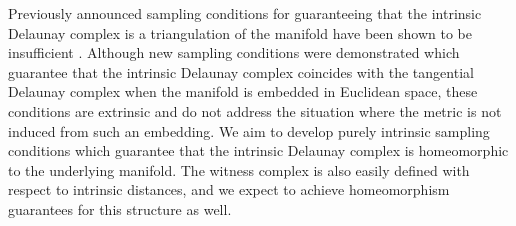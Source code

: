 Previously announced sampling conditions \cite{leibon2000} for
guaranteeing that the intrinsic Delaunay complex is a triangulation of
the manifold have been shown to be insufficient
\cite{boissonnat2012stab}. Although new sampling conditions were
demonstrated which guarantee that the intrinsic Delaunay complex
coincides with the tangential Delaunay complex when the manifold is
embedded in Euclidean space, these conditions are extrinsic and do not
address the situation where the metric is not induced from such an
embedding. We aim to develop purely intrinsic sampling conditions
which guarantee that the intrinsic Delaunay complex is homeomorphic to
the underlying manifold. The witness complex is also easily defined
with respect to intrinsic distances, and we expect to achieve
homeomorphism guarantees for this structure as well.











%











